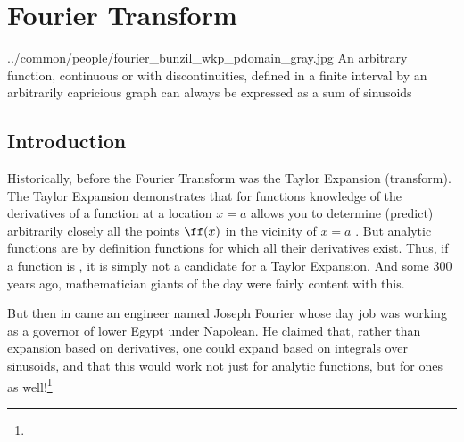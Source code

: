 
\chapter{Fourier Transform}
\label{app:fourier}
  {../common/people/fourier_bunzil_wkp_pdomain_gray.jpg}
  {%
  An arbitrary function, continuous or with discontinuities, defined in a finite interval by an arbitrarily
  capricious graph can always be expressed as a sum of sinusoids%
  }

\section{Introduction}
Historically, before the Fourier Transform was the Taylor Expansion (transform). 
The Taylor Expansion demonstrates that for  functions
knowledge of the derivatives of a function at a location $x=a$
allows you to determine (predict) arbitrarily closely all the points $\ff(x)$ in the vicinity of $x=a$ .
But analytic functions are by definition functions for which all their derivatives exist.
Thus, if a function is , it is simply not a candidate for a Taylor Expansion.
And some 300 years ago, mathematician giants of the day were fairly content with this.

But then in came an engineer named Joseph Fourier whose day job was working as a governor of lower Egypt under Napolean.
He claimed that, rather than expansion based on derivatives, one could expand based on integrals over sinusoids,
and that this would work not just for analytic functions, but for  ones as well!\footnote{}

